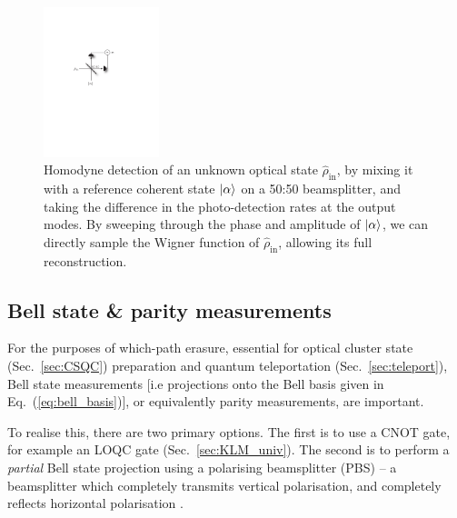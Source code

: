 \begin{figure}[htpb]
\includegraphics[width=0.3\textwidth]{homodyne}
\caption{Homodyne detection of an unknown optical state $\hat\rho_\mathrm{in}$, by mixing it with a reference coherent state $|\alpha\rangle$ on a 50:50 beamsplitter, and taking the difference in the photo-detection rates at the output modes. By sweeping through the phase and amplitude of $|\alpha\rangle$, we can directly sample the Wigner function of $\hat\rho_\mathrm{in}$, allowing its full reconstruction.} \label{fig:homodyne}
\end{figure}

%
%

\subsection{Bell state \& parity measurements} \label{sec:bell_proj} 

For the purposes of which-path erasure, essential for optical cluster state (Sec.~\ref{sec:CSQC}) preparation and quantum teleportation (Sec.~\ref{sec:teleport}), Bell state measurements [i.e projections onto the Bell basis given in Eq.~(\ref{eq:bell_basis})], or equivalently parity measurements, are important.

To realise this, there are two primary options. The first is to use a CNOT gate, for example an LOQC gate (Sec.~\ref{sec:KLM_univ}). The second is to perform a \textit{partial} Bell state projection using a polarising beamsplitter (PBS) -- a beamsplitter which completely transmits vertical polarisation, and completely reflects horizontal polarisation \cite{bib:BraunsteinMann95}.

